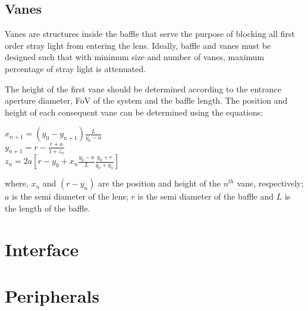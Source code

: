 \subsection{Vanes}
Vanes are structures inside the baffle that serve the purpose of blocking all first order stray light from entering the lens. Ideally, baffle and vanes must be designed such that with minimum size and number of vanes, maximum percentage of stray light is attenuated.
\par
The height of the first vane should be determined according to the entrance  aperture diameter, FoV of the system and the baffle length. The position and height of each consequent vane can be determined using the equations:
\begin{center}
    $x_{n+1}=(y_{0}-y_{n+1})\frac{L}{y_{0}-a}$\\
    \vspace{2em}
    $y_{n+1}=r-\frac{r+a}{1+z_{n}} $\\
    \vspace{2em}
    $z_{n}=2a[r-y_{0}+x_{n}\frac{y_{0}-a}{L}\frac{y_{0}+r}{y_{0}+y_{n}}]$
\end{center}
\par
where, $x_{n}$ and $(r-y_{n})$ are the position and height of the $n^{th}$ vane, respectively; $a$ is the semi diameter of the lens; $r$ is the semi diameter of the baffle and $L$ is the length of the baffle.



\section{Interface}
\section{Peripherals}
\clearpage

